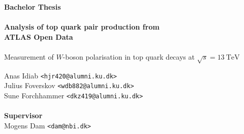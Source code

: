 \documentclass[a4paper,oneside]{memoir}
\begin{document}
    \thispagestyle{empty}
    \begin{adjustwidth}{-3cm}{-1.5cm}
    \vspace*{-1cm}
    \textbf{\Huge Bachelor Thesis} \\
    \vspace*{2.5cm} \\
    \textbf{\Huge Analysis of top quark pair production from \\ATLAS Open Data} \\
    \vspace*{.1cm} \\
    {\huge Measurement of $W$-boson polarisation in top quark decays at $\sqrt s = 13 \ \mathrm{TeV}$}\\
    \begin{tabbing}
    Anas Idiab  \hspace{2cm} \= \texttt{<hjr420@alumni.ku.dk>} \\
    Julius Foverskov \> \texttt{<wdb882@alumni.ku.dk>} \\
    Sune Forchhammer \> \texttt{<dkz419@alumni.ku.dk>} \\
    \\[12cm]
    \textbf{\Large Supervisor} \\
    Mogens Dam \> \texttt{<dam@nbi.dk>} \\
    \end{tabbing}
    \end{adjustwidth}
    \newpage
    \ClearWallPaper
\end{document}
